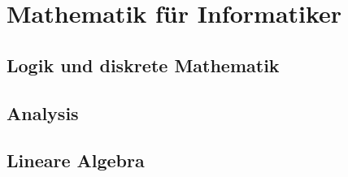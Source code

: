 \part{Mathematik für Informatiker}
\chapter{Logik und diskrete Mathematik}

\chapter{Analysis}

\chapter{Lineare Algebra}

